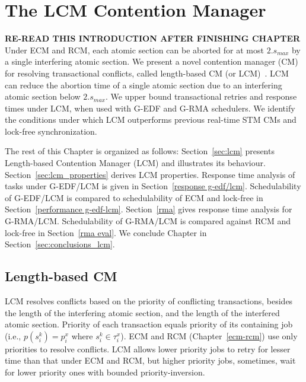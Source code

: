 \chapter{\label{ch_lcm}The LCM Contention Manager}
%
\textbf{RE-READ THIS INTRODUCTION AFTER FINISHING CHAPTER}
Under ECM and RCM, each atomic section can be aborted for at most $2.s_{max}$ by a single interfering atomic section. We present a novel contention manager (CM) for resolving transactional conflicts, called length-based CM (or LCM)~\cite{lcmdac2012}. LCM can reduce the abortion time of a single atomic section due to an interfering atomic section below $2.s_{max}$. We upper bound transactional retries and response times under LCM, when used with G-EDF and  G-RMA schedulers. We identify the conditions under which LCM outperforms previous real-time STM CMs and lock-free synchronization.

The rest of this Chapter is organized as follows: Section~\ref{sec:lcm} presents Length-based Contention Manager (LCM) and illustrates its behaviour. Section~\ref{sec:lcm_properties} derives LCM properties. Response time analysis of tasks under G-EDF/LCM is given in Section~\ref{response g-edf/lcm}. Schedulability of G-EDF/LCM is compared to schedulability of ECM and lock-free in Section~\ref{performance g-edf-lcm}. Section~\ref{rma} gives response time analysis for G-RMA/LCM. Schedulability of G-RMA/LCM is compared against RCM and lock-free in Section~\ref{rma eval}. We conclude Chapter in Section~\ref{sec:conclusions_lcm}.
%
\section{\label{sec:lcm}Length-based CM}
%
LCM resolves conflicts based on the priority of conflicting transactions, besides the length of the interfering atomic section, and the length of the interfered atomic section. Priority of each transaction equals priority of its containing job (i.e., $p\left(s_i^k\right)=p_i^x$ where $s_i^k \in \tau_i^x$). ECM and RCM (Chapter~\ref{ecm-rcm}) use only priorities to resolve conflicts. LCM allows lower priority jobs to retry for lesser time than that under ECM and RCM, but higher priority jobs, sometimes, wait for lower priority ones with bounded priority-inversion.

